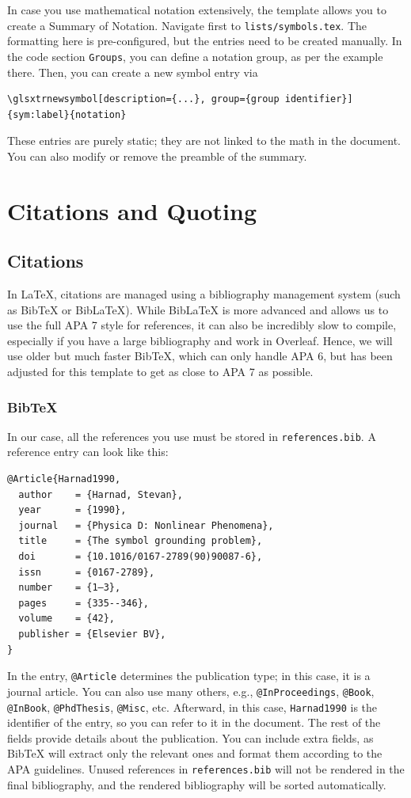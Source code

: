 In case you use mathematical notation extensively, the template allows you to create a Summary of Notation.
Navigate first to \verb|lists/symbols.tex|. The formatting here is pre-configured, but the entries need to be
created manually. In the code section \verb|Groups|, you can define a notation group, as per the example there.
Then, you can create a new symbol entry via
{\footnotesize
\begin{verbatim}
\glsxtrnewsymbol[description={...}, group={group identifier}]{sym:label}{notation}
\end{verbatim}
}
These entries are purely static; they are not linked to the math in the document. You can also modify or remove the
preamble of the summary.


\section{Citations and Quoting}
\label{sec:citations}

\subsection{Citations}

In \LaTeX{}, citations are managed using a bibliography management system (such as Bib\TeX{} or Bib\LaTeX{}).
While Bib\LaTeX{} is more advanced and allows us to use the full APA 7 style for references, it can also be
incredibly slow to compile, especially if you have a large bibliography and work in Overleaf. Hence, we will use
older but much faster Bib\TeX{}, which can only handle APA 6, but has been adjusted for this template to get as
close to APA 7 as possible.

\subsubsection*{Bib\TeX{}}

In our case, all the references you use must be stored in \verb|references.bib|. A reference entry can look like this:
\begin{verbatim}
@Article{Harnad1990,
  author    = {Harnad, Stevan},
  year      = {1990},
  journal   = {Physica D: Nonlinear Phenomena},
  title     = {The symbol grounding problem},
  doi       = {10.1016/0167-2789(90)90087-6},
  issn      = {0167-2789},
  number    = {1–3},
  pages     = {335--346},
  volume    = {42},
  publisher = {Elsevier BV},
}
\end{verbatim}
In the entry, \verb|@Article| determines the publication type; in this case, it is a journal article. You can
also use many others, e.g., \verb|@InProceedings|, \verb|@Book|, \verb|@InBook|, \verb|@PhdThesis|, \verb|@Misc|,
etc. Afterward, in this case, \verb|Harnad1990| is the identifier of the entry, so you can refer to it in the
document. The rest of the fields provide details about the publication. You can include extra fields, as Bib\TeX{}
will extract only the relevant ones and format them according to the APA guidelines. Unused references in
\verb|references.bib| will not be rendered in the final bibliography, and the rendered bibliography will be sorted
automatically.

